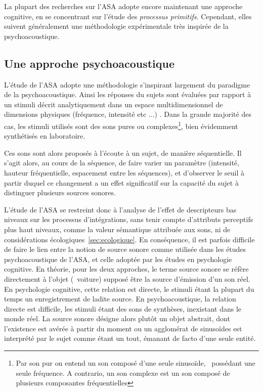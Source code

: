 La plupart des recherches sur l'ASA adopte encore maintenant une approche cognitive, en se concentrant sur l'étude des \emph{processus primitifs}. Cependant, elles suivent généralement une méthodologie expérimentale très inspirée de la psychoacoustique.

\subsection{Une approche psychoacoustique}

L'étude de l'ASA adopte une méthodologie s'inspirant largement du paradigme de la psychoacoustique. Ainsi les réponses du sujets sont évaluées par rapport à un stimuli décrit analytiquement dans un espace multidimensionnel de dimensions physiques (fréquence, intensité etc $\ldots$) \citep{dubois2006cognitive}. Dans la grande majorité des cas, les stimuli utilisés sont des sons pures ou complexes\footnote{Par son pur on entend un son composé d'une seule sinusoïde, \ie~possédant une seule fréquence. A contrario, un son complexe est un son composé de plusieurs composantes fréquentielles}, bien évidemment synthétisés en laboratoire. 

Ces sons sont alors proposés à l'écoute à un sujet, de manière séquentielle. Il s'agit alors, au cours de la séquence, de faire varier un paramètre (intensité, hauteur fréquentielle, espacement entre les séquences), et d'observer le seuil à partir duquel ce changement a un effet significatif sur la capacité du sujet à distinguer plusieurs sources sonores.

L'étude de l'ASA se restreint donc à l'analyse de l'effet de descripteurs bas niveaux sur les processus d'intégrations, sans tenir compte d'attributs perceptifs plus haut niveaux, comme la valeur sémantique attribuée aux sons, ni de considérations écologiques~\ref{sec:ecologique}. En conséquence, il est parfois difficile de faire le lien entre la notion de source sonore comme utilisée dans les études psychoacoustique de l'ASA, et celle adoptée par les études en psychologie cognitive. En théorie, pour les deux approches, le terme source sonore se réfère directement à l'objet (\eg~voiture) supposé être la source d'émission d'un son réel. En psychologie cognitive, cette relation est directe, le stimuli étant la plupart du temps un enregistrement de ladite source. En psychoacoustique, la relation directe est difficile, les stimuli étant des sons de synthèses, inexistant dans le monde réel. La source sonore désigne alors plutôt un objet abstrait, dont l’existence est avérée à partir du moment ou un agglomérat de sinusoïdes est interprété par le sujet comme étant un tout, émanant de facto d'une seule entité. 

